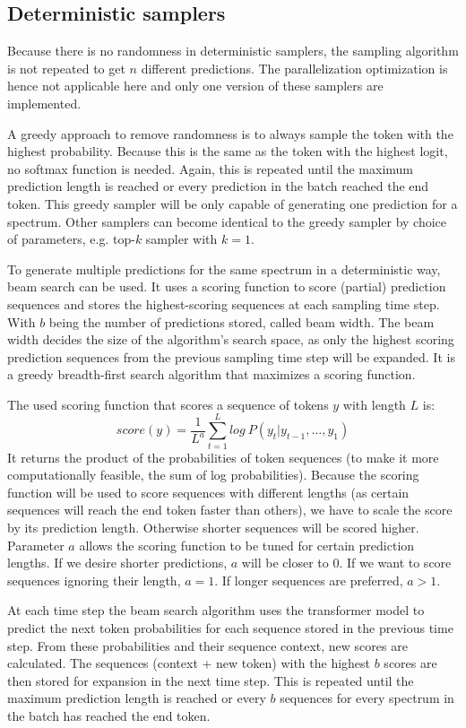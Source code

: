 \subsection{Deterministic samplers}

Because there is no randomness in deterministic samplers, the sampling algorithm is not repeated to get $n$ different predictions. The parallelization optimization is hence not applicable here and only one version of these samplers are implemented.

A greedy approach to remove randomness is to always sample the token with the highest probability. Because this is the same as the token with the highest logit, no softmax function is needed.
Again, this is repeated until the maximum prediction length is reached or every prediction in the batch reached the end token.
This greedy sampler will be only capable of generating one prediction for a spectrum.
Other samplers can become identical to the greedy sampler by choice of parameters, e.g. top-$k$ sampler with $k=1$.

To generate multiple predictions for the same spectrum in a deterministic way, beam search can be used.
It uses a scoring function to score (partial) prediction sequences and stores the highest-scoring sequences at each sampling time step.
With $b$ being the number of predictions stored, called beam width.
The beam width decides the size of the algorithm's search space, as only the highest scoring prediction sequences from the previous sampling time step will be expanded.
It is a greedy breadth-first search algorithm that maximizes a scoring function.

The used scoring function that scores a sequence of tokens $y$ with length $L$ is:
\[score(y) = \frac{1}{L^a} \sum\limits_{t=1}^{L}log\ P(y_t | y_{t-1},\dots,y_{1})\]
It returns the product of the probabilities of token sequences (to make it more computationally feasible, the sum of log probabilities).
Because the scoring function will be used to score sequences with different lengths (as certain sequences will reach the end token faster than others),
we have to scale the score by its prediction length. Otherwise shorter sequences will be scored higher.
Parameter $a$ allows the scoring function to be tuned for certain prediction lengths.
If we desire shorter predictions, $a$ will be closer to 0.
If we want to score sequences ignoring their length, $a=1$. 
If longer sequences are preferred, $a>1$.

At each time step the beam search algorithm uses the transformer model to predict the next token probabilities for each sequence stored in the previous time step.
From these probabilities and their sequence context, new scores are calculated.
The sequences (context + new token) with the highest $b$ scores are then stored for expansion in the next time step.
This is repeated until the maximum prediction length is reached or every $b$ sequences for every spectrum in the batch has reached the end token.


